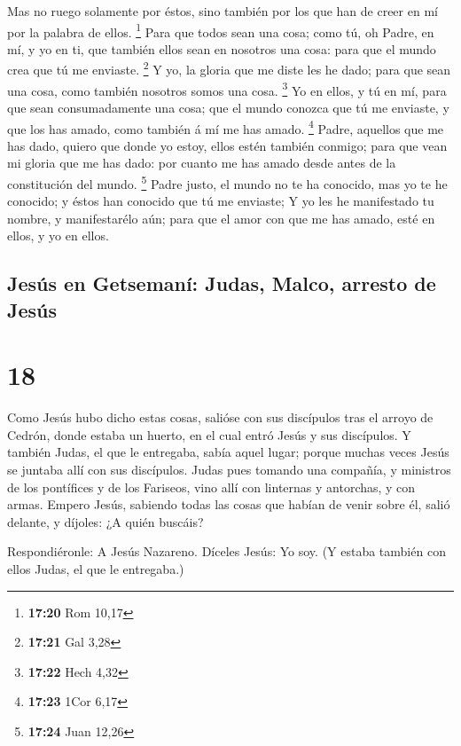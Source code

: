  Mas no ruego solamente por éstos, sino también por los
que han de creer en mí por la palabra de ellos. \footnote{\textbf{17:20}
  Rom 10,17}  Para que todos sean una cosa; como tú, oh
Padre, en mí, y yo en ti, que también ellos sean en nosotros una cosa:
para que el mundo crea que tú me enviaste. \footnote{\textbf{17:21} Gal
  3,28}  Y yo, la gloria que me diste les he dado; para
que sean una cosa, como también nosotros somos una cosa. \footnote{\textbf{17:22}
  Hech 4,32}  Yo en ellos, y tú en mí, para que sean
consumadamente una cosa; que el mundo conozca que tú me enviaste, y que
los has amado, como también á mí me has amado. \footnote{\textbf{17:23}
  1Cor 6,17}  Padre, aquellos que me has dado, quiero que
donde yo estoy, ellos estén también conmigo; para que vean mi gloria que
me has dado: por cuanto me has amado desde antes de la constitución del
mundo. \footnote{\textbf{17:24} Juan 12,26}  Padre justo,
el mundo no te ha conocido, mas yo te he conocido; y éstos han conocido
que tú me enviaste;  Y yo les he manifestado tu nombre, y
manifestarélo aún; para que el amor con que me has amado, esté en ellos,
y yo en ellos.

\hypertarget{jesuxfas-en-getsemanuxed-judas-malco-arresto-de-jesuxfas}{%
\subsection{Jesús en Getsemaní: Judas, Malco, arresto de
Jesús}\label{jesuxfas-en-getsemanuxed-judas-malco-arresto-de-jesuxfas}}

\hypertarget{section-17}{%
\section{18}\label{section-17}}

 Como Jesús hubo dicho estas cosas, salióse con sus
discípulos tras el arroyo de Cedrón, donde estaba un huerto, en el cual
entró Jesús y sus discípulos.  Y también Judas, el que le
entregaba, sabía aquel lugar; porque muchas veces Jesús se juntaba allí
con sus discípulos.  Judas pues tomando una compañía, y
ministros de los pontífices y de los Fariseos, vino allí con linternas y
antorchas, y con armas.  Empero Jesús, sabiendo todas las
cosas que habían de venir sobre él, salió delante, y díjoles: ¿A quién
buscáis?

 Respondiéronle: A Jesús Nazareno. Díceles Jesús: Yo soy.
(Y estaba también con ellos Judas, el que le entregaba.)


